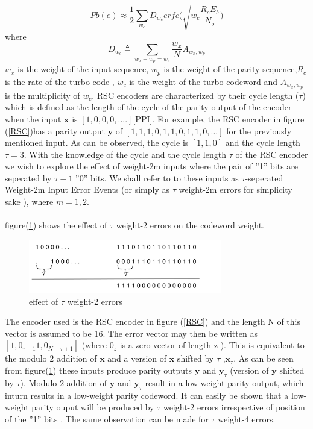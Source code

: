 \documentclass[20 pts]{article}
\begin{document}
 \begin{equation} 
 Pb(e) \approx \frac{1}{2}\sum_{w_c}D_{w_c} 
  erfc \Bigg(\sqrt{w_c\frac{R_cE_b}{N_o}} \Bigg)
  \label{aprox}
  \end{equation}
 where 
  $$ D_{w_c}\triangleq \sum_{w_x+w_p=w_c} \frac{w_x}{N}A_{w_x,w_p}$$
  $w_x$ is the weight of the input sequence, $w_p$ is the weight of the parity 
  sequence,$R_c$ is the rate of the turbo code , $w_c$ is the weight of the turbo 
  codeword and $A_{w_x,w_p}$ is the multiplicity of $w_c$. 
 RSC encoders are
characterized by their cycle length ($\tau$) which is defined as the length of the cycle
 of the parity output of the encoder when the input $\mathbf{x}$ is $[1,0,0,0,....]$[PPI]. 
For example, the RSC encoder in figure (\ref{RSC})has a parity output $\mathbf{y}$ of 
$[1,1,1,0,1,1,0,1,1,0,...]$
for the previously mentioned input. As can be observed, the cycle is $[1,1,0]$ and
the cycle length $\tau=3$. With the knowledge of the cycle and the cycle length $\tau$
of the RSC encoder we wish to explore the effect of weight-2m inputs where the pair of
''1'' bits
 are seperated by $\tau-1$ ''0'' bits. We shall refer to to these inputs as
 $\tau$-seperated Weight-2m Input Error Events (or simply as $\tau$ weight-2m errors for
 simplicity sake ), where $m={1,2}$. 

\paragraph{}
 figure(\ref{RSC3})  shows the effect of $\tau$ weight-2 errors on the codeword weight.
 
\begin{figure}[h!]
\centering
		\includegraphics[width=0.75\textwidth]{RSCExample.pdf}
		\caption{ effect of $\tau$ weight-2 errors}
		\label{RSC3}
		\end{figure}
	
 The encoder used is the RSC encoder in figure (\ref{RSC})
  and the length N of this vector is assumed to 
be 16. The error vector may then be written as $[1, 0_{\tau-1} 1, 0_{N-\tau+1}]$
(where $0_z$ is a zero vector of length z ).
This is equivalent to the modulo 2 addition of $\mathbf{x}$ and a version of
 $\mathbf{x}$ shifted by $\tau$ ,$\mathbf{x}_{\tau}$. As can be seen from 
figure(\ref{RSC3}) these inputs produce parity outputs $\mathbf{y}$ and $\mathbf{y}_{\tau}$
(version of $\mathbf{y}$ shifted by $\tau$). Modulo 2 addition of $\mathbf{y}$ and
$\mathbf{y}_{\tau}$ result in a low-weight parity output, which inturn results
in a low-weight parity codeword. It can easily be shown that a low-weight parity ouput
will be produced by $\tau$ weight-2 errors irrespective of position of the ''1'' bits . The
same observation can be made for $\tau$ weight-4 errors.
\end{document}

